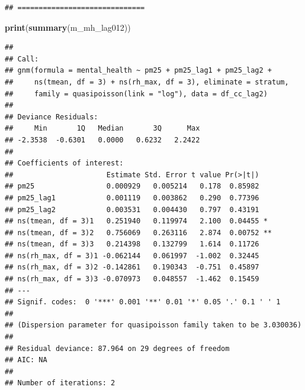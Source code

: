 \documentclass[
]{article}
\newenvironment{Shaded}{\begin{snugshade}}{\end{snugshade}}
\newcommand{\FunctionTok}[1]{\textcolor[rgb]{0.13,0.29,0.53}{\textbf{#1}}}
\newcommand{\NormalTok}[1]{#1}
\begin{document}
\begin{verbatim}
## ==============================
\end{verbatim}

\begin{Shaded}
\begin{Highlighting}[]
\FunctionTok{print}\NormalTok{(}\FunctionTok{summary}\NormalTok{(m\_mh\_lag012))}
\end{Highlighting}
\end{Shaded}

\begin{verbatim}
## 
## Call:
## gnm(formula = mental_health ~ pm25 + pm25_lag1 + pm25_lag2 + 
##     ns(tmean, df = 3) + ns(rh_max, df = 3), eliminate = stratum, 
##     family = quasipoisson(link = "log"), data = df_cc_lag2)
## 
## Deviance Residuals: 
##     Min       1Q   Median       3Q      Max  
## -2.3538  -0.6301   0.0000   0.6232   2.2422  
## 
## Coefficients of interest:
##                      Estimate Std. Error t value Pr(>|t|)   
## pm25                 0.000929   0.005214   0.178  0.85982   
## pm25_lag1            0.001119   0.003862   0.290  0.77396   
## pm25_lag2            0.003531   0.004430   0.797  0.43191   
## ns(tmean, df = 3)1   0.251940   0.119974   2.100  0.04455 * 
## ns(tmean, df = 3)2   0.756069   0.263116   2.874  0.00752 **
## ns(tmean, df = 3)3   0.214398   0.132799   1.614  0.11726   
## ns(rh_max, df = 3)1 -0.062144   0.061997  -1.002  0.32445   
## ns(rh_max, df = 3)2 -0.142861   0.190343  -0.751  0.45897   
## ns(rh_max, df = 3)3 -0.070973   0.048557  -1.462  0.15459   
## ---
## Signif. codes:  0 '***' 0.001 '**' 0.01 '*' 0.05 '.' 0.1 ' ' 1
## 
## (Dispersion parameter for quasipoisson family taken to be 3.030036)
## 
## Residual deviance: 87.964 on 29 degrees of freedom
## AIC: NA
## 
## Number of iterations: 2
\end{verbatim}
\end{document}
